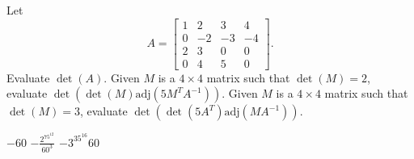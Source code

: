 
\begin{Exercise}[
name={},
title={}, 
difficulty=0,
origin={\cite{YL}}]
Let
\[
 A=\begin{bmatrix}
1 & 2 & 3 & 4\\
0 & -2 & -3 & -4\\
2 & 3 & 0 & 0\\
0 & 4 & 5 & 0
\end{bmatrix}.
\]
\Question Evaluate $\det(A)$.
\Question Given $M$ is a $4\times 4$ matrix such that $\det(M)=2$, evaluate
$\det(\det(M)\text{adj}(5M^TA^{-1}))$.
\Question Given $M$ is a $4\times 4$ matrix such that $\det(M)=3$, evaluate
$\det(\det(5A^T)\text{adj}(MA^{-1}))$.
\end{Exercise}

\begin{Answer}
\begin{multicols}{3}
\Question $-60$
\Question $-\frac{2^75^{12}}{60^3}$
\Question $-3^35^{16}60$
\EndCurrentQuestion
\end{multicols}
\end{Answer}
